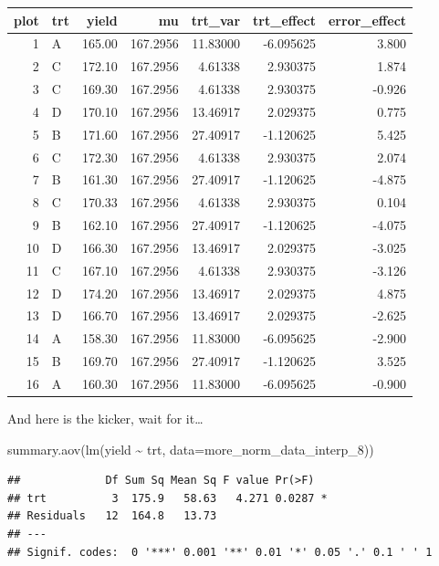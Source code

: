 \documentclass[
]{book}
\newenvironment{Shaded}{\begin{snugshade}}{\end{snugshade}}
\newcommand{\AttributeTok}[1]{\textcolor[rgb]{0.77,0.63,0.00}{#1}}
\newcommand{\FunctionTok}[1]{\textcolor[rgb]{0.00,0.00,0.00}{#1}}
\newcommand{\NormalTok}[1]{#1}
\newcommand{\SpecialCharTok}[1]{\textcolor[rgb]{0.00,0.00,0.00}{#1}}
\begin{document}
\begin{tabular}{r|l|r|r|r|r|r}
\hline
plot & trt & yield & mu & trt\_var & trt\_effect & error\_effect\\
\hline
1 & A & 165.00 & 167.2956 & 11.83000 & -6.095625 & 3.800\\
\hline
2 & C & 172.10 & 167.2956 & 4.61338 & 2.930375 & 1.874\\
\hline
3 & C & 169.30 & 167.2956 & 4.61338 & 2.930375 & -0.926\\
\hline
4 & D & 170.10 & 167.2956 & 13.46917 & 2.029375 & 0.775\\
\hline
5 & B & 171.60 & 167.2956 & 27.40917 & -1.120625 & 5.425\\
\hline
6 & C & 172.30 & 167.2956 & 4.61338 & 2.930375 & 2.074\\
\hline
7 & B & 161.30 & 167.2956 & 27.40917 & -1.120625 & -4.875\\
\hline
8 & C & 170.33 & 167.2956 & 4.61338 & 2.930375 & 0.104\\
\hline
9 & B & 162.10 & 167.2956 & 27.40917 & -1.120625 & -4.075\\
\hline
10 & D & 166.30 & 167.2956 & 13.46917 & 2.029375 & -3.025\\
\hline
11 & C & 167.10 & 167.2956 & 4.61338 & 2.930375 & -3.126\\
\hline
12 & D & 174.20 & 167.2956 & 13.46917 & 2.029375 & 4.875\\
\hline
13 & D & 166.70 & 167.2956 & 13.46917 & 2.029375 & -2.625\\
\hline
14 & A & 158.30 & 167.2956 & 11.83000 & -6.095625 & -2.900\\
\hline
15 & B & 169.70 & 167.2956 & 27.40917 & -1.120625 & 3.525\\
\hline
16 & A & 160.30 & 167.2956 & 11.83000 & -6.095625 & -0.900\\
\hline
\end{tabular}

And here is the kicker, wait for it\ldots{}

\begin{Shaded}
\begin{Highlighting}[]
\FunctionTok{summary.aov}\NormalTok{(}\FunctionTok{lm}\NormalTok{(yield }\SpecialCharTok{\textasciitilde{}}\NormalTok{ trt, }\AttributeTok{data=}\NormalTok{more\_norm\_data\_interp\_8))}
\end{Highlighting}
\end{Shaded}

\begin{verbatim}
##             Df Sum Sq Mean Sq F value Pr(>F)  
## trt          3  175.9   58.63   4.271 0.0287 *
## Residuals   12  164.8   13.73                 
## ---
## Signif. codes:  0 '***' 0.001 '**' 0.01 '*' 0.05 '.' 0.1 ' ' 1
\end{verbatim}
\end{document}

